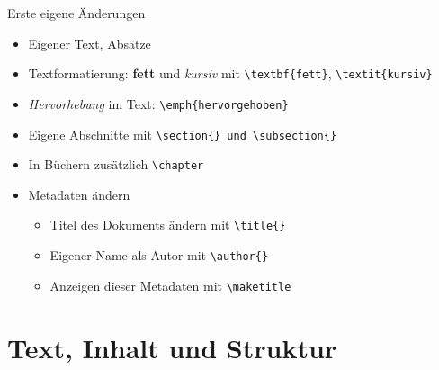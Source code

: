 \documentclass[presentation,aspectratio=169]{beamer}
\begin{document}
\begin{frame}[fragile]{Erste eigene Änderungen}
  \begin{itemize}
    \item Eigener Text, Absätze
    \item Textformatierung: \textbf{fett} und \textit{kursiv} mit \verb|\textbf{fett}|, \verb|\textit{kursiv}|
    \item \emph{Hervorhebung} im Text: \verb|\emph{hervorgehoben}|
    \item Eigene Abschnitte mit \verb|\section{} und \subsection{}|
    \item In Büchern zusätzlich \verb|\chapter|
    \item Metadaten ändern
      \begin{itemize}
        \item Titel des Dokuments ändern mit \verb|\title{}|
        \item Eigener Name als Autor mit \verb|\author{}|
        \item Anzeigen dieser Metadaten mit \verb|\maketitle|
      \end{itemize}
  \end{itemize}
\end{frame}

\maketitle

\section{Text, Inhalt und Struktur}
\end{document}
